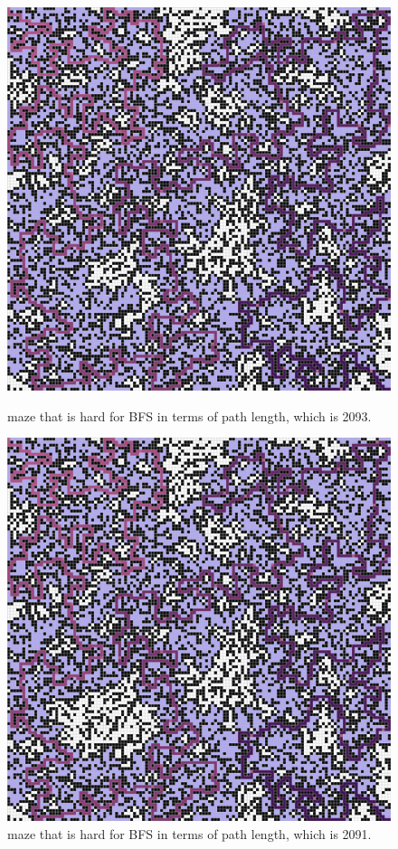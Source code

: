 \documentclass[letter]{article}
\begin{document}
\begin{enumerate}[resume]
\begin{enumerate}
\begin{enumerate}
\begin{figure}
					\includegraphics[width=\textwidth]{../pics/bp/2093.png}
					\caption{\label{fig:bp2}maze that is hard for BFS in terms of path length, which is 2093.}
					\endminipage\hfill
					\includegraphics[width=\textwidth]{../pics/bp/2091.png}
					\caption{\label{fig:bp3}maze that is hard for BFS in terms of path length, which is 2091.}
					\endminipage
					\endminipage
					

\end{figure}
\end{enumerate}
\end{enumerate}
\end{enumerate}
\end{document}
